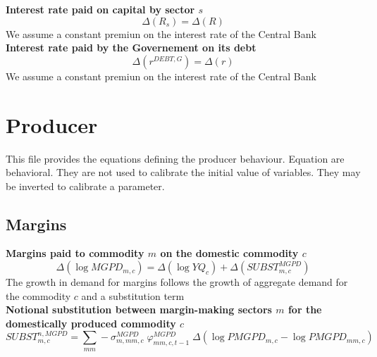 \documentclass[12pt]{article}
\numberwithin{equation}{section}
\begin{document}
\noindent\textbf{Interest rate paid on capital by sector $s$} \\
\begin{dmath}
\varDelta \left(R_{s}\right) = \varDelta \left(R\right)
\end{dmath}
We assume a constant premiun on the interest rate of the Central Bank \\

\noindent\textbf{Interest rate paid by the Governement on its debt} \\
\begin{dmath}
\varDelta \left(r^{DEBT,G}\right) = \varDelta \left(r\right)
\end{dmath}
We assume a constant premiun on the interest rate of the Central Bank \\


\section{Producer}



This file provides the equations defining the producer behaviour.
Equation are behavioral. They are not used to calibrate the initial value of variables. They may be inverted to calibrate a parameter.



\subsection{Margins}



\noindent\textbf{Margins paid to commodity $m$ on the domestic commodity $c$} \\
\begin{dmath}
\varDelta \left(\operatorname{log} MGPD_{m, c}\right) = \varDelta \left(\operatorname{log} YQ_{c}\right) + \varDelta \left(SUBST^{MGPD}_{m, c}\right)
\end{dmath}
The growth in demand for margins follows the growth of aggregate demand for the commodity $c$ and a substitution term \\

\noindent\textbf{Notional substitution between margin-making sectors $m$ for the domestically produced commodity $c$} \\
\begin{dmath}
SUBST^{n,MGPD}_{m, c} = \sum_{mm} -\sigma^{MGPD}_{m, mm, c} \; \varphi^{MGPD}_{mm, c, t-1} \; \varDelta \left(\operatorname{log} PMGPD_{m, c} - \operatorname{log} PMGPD_{mm, c}\right)
\end{dmath}
\end{document}
